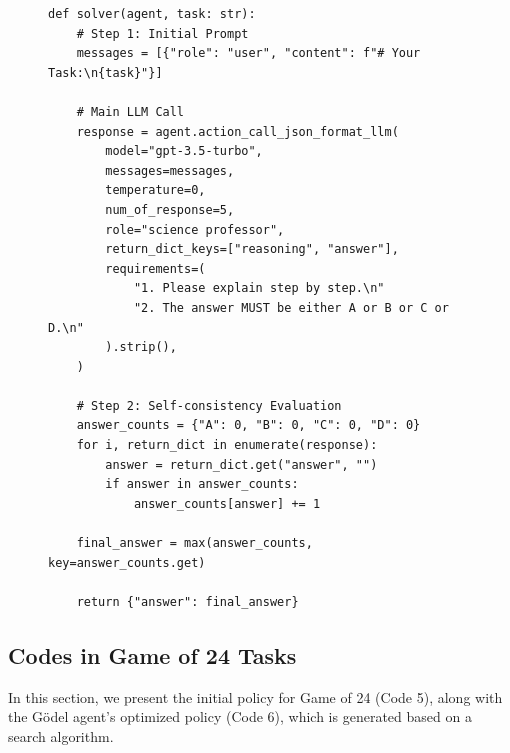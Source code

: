 \documentclass[11pt]{article}
\newcommand{\framework}{Gödel Agent\xspace}
\begin{document}
\begin{figure}[ht]
\begin{lstlisting}[style=pythonstyle, caption={Code of the best policy found by \framework for GPQA.}]
def solver(agent, task: str):
    # Step 1: Initial Prompt
    messages = [{"role": "user", "content": f"# Your Task:\n{task}"}]
    
    # Main LLM Call
    response = agent.action_call_json_format_llm(
        model="gpt-3.5-turbo", 
        messages=messages, 
        temperature=0, 
        num_of_response=5,
        role="science professor", 
        return_dict_keys=["reasoning", "answer"], 
        requirements=(
            "1. Please explain step by step.\n"
            "2. The answer MUST be either A or B or C or D.\n"
        ).strip(), 
    )

    # Step 2: Self-consistency Evaluation
    answer_counts = {"A": 0, "B": 0, "C": 0, "D": 0}
    for i, return_dict in enumerate(response):
        answer = return_dict.get("answer", "")
        if answer in answer_counts:
            answer_counts[answer] += 1
    
    final_answer = max(answer_counts, key=answer_counts.get)

    return {"answer": final_answer}

\end{lstlisting}
\end{figure}



\subsection{Codes in Game of 24 Tasks}
\label{sec:code24}

In this section, we present the initial policy for Game of 24 (Code 5), along with the Gödel agent's optimized policy (Code 6), which is generated based on a search algorithm.
\end{document}
